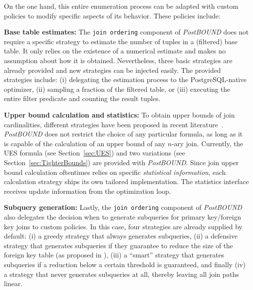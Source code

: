 On the one hand, this entire enumeration process can be adapted with custom policies to modify specific aspects of its behavior. These policies include:

\begin{compactitem}
    \item[\textbf{Base table estimates:}] The \texttt{join ordering} component of \emph{PostBOUND} does not require a specific strategy to estimate the number of tuples in a (filtered) base table. It only relies on the existence of a numerical estimate and makes no assumption about how it is obtained. Nevertheless, three basic strategies are already provided and new strategies can be injected easily. The provided strategies include: (i) delegating the estimation process to the PostgreSQL-native optimizer, (ii) sampling a fraction of the filtered table, or (iii) executing the entire filter predicate and counting the result tuples.
    \item[\textbf{Upper bound calculation and statistics:}] To obtain upper bounds of join cardinalities, different strategies have been proposed in recent literature~\cite{DBLP:conf/sigmod/CaiBS19,DBLP:journals/corr/abs-2201-04166,hertzschuch-21-ues}. \emph{PostBOUND} does not restrict the choice of any particular formula, as long as it is capable of the calculation of an upper bound of any $n$-ary join. Currently, the UES formula (see Section~\ref{sec:UES}) and two variations (see Section~\ref{sec:TighterBounds}) are provided with \emph{PostBOUND}. Since join upper bound calculation oftentimes relies on specific \emph{statistical information}, each calculation strategy ships its own tailored implementation. The statistics interface receives update information from the optimization loop.
    \item[\textbf{Subquery generation:}] \label{item:postbound-subqueries} Lastly, the \texttt{join ordering} component of \emph{PostBOUND} also delegates the decision when to generate subqueries for primary key/foreign key joins to custom policies. In this case, four strategies are already supplied by default: (i) a greedy strategy that always generates subqueries, (ii) a defensive strategy that generates subqueries if they guarantee to reduce the size of the foreign key table (as proposed in \cite{hertzschuch-21-ues}), (iii) a ``smart'' strategy that generates subqueries if a reduction below a certain threshold is guaranteed, and finally (iv) a strategy that never generates subqueries at all, thereby leaving all join paths linear.
\end{compactitem}

